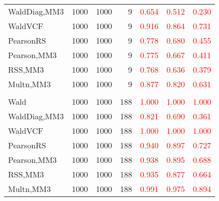 \documentclass[
]{article}
\begin{document}
\begin{table}[H]
{\begin{tabular}[t]{lrrrrrr}
\hspace{1em}WaldDiag,MM3 & 1000 & 1000 & 9 & \textcolor{red}{0.654} & \textcolor{red}{0.512} & \textcolor{red}{0.230}\\
\hspace{1em}WaldVCF & 1000 & 1000 & 9 & \textcolor{red}{0.916} & \textcolor{red}{0.864} & \textcolor{red}{0.731}\\
\hspace{1em}PearsonRS & 1000 & 1000 & 9 & \textcolor{red}{0.778} & \textcolor{red}{0.680} & \textcolor{red}{0.455}\\
\hspace{1em}Pearson,MM3 & 1000 & 1000 & 9 & \textcolor{red}{0.775} & \textcolor{red}{0.667} & \textcolor{red}{0.411}\\
\hspace{1em}RSS,MM3 & 1000 & 1000 & 9 & \textcolor{red}{0.768} & \textcolor{red}{0.636} & \textcolor{red}{0.379}\\
\hspace{1em}Multn,MM3 & 1000 & 1000 & 9 & \textcolor{red}{0.877} & \textcolor{red}{0.820} & \textcolor{red}{0.631}\\
\addlinespace[0.3em]
\multicolumn{7}{l}{\textbf{3F 15V}}\\
\hspace{1em}Wald & 1000 & 1000 & 188 & \textcolor{red}{1.000} & \textcolor{red}{1.000} & \textcolor{red}{1.000}\\
\hspace{1em}WaldDiag,MM3 & 1000 & 1000 & 188 & \textcolor{red}{0.821} & \textcolor{red}{0.690} & \textcolor{red}{0.361}\\
\hspace{1em}WaldVCF & 1000 & 1000 & 188 & \textcolor{red}{1.000} & \textcolor{red}{1.000} & \textcolor{red}{1.000}\\
\hspace{1em}PearsonRS & 1000 & 1000 & 188 & \textcolor{red}{0.940} & \textcolor{red}{0.897} & \textcolor{red}{0.727}\\
\hspace{1em}Pearson,MM3 & 1000 & 1000 & 188 & \textcolor{red}{0.938} & \textcolor{red}{0.895} & \textcolor{red}{0.688}\\
\hspace{1em}RSS,MM3 & 1000 & 1000 & 188 & \textcolor{red}{0.935} & \textcolor{red}{0.877} & \textcolor{red}{0.664}\\
\hspace{1em}Multn,MM3 & 1000 & 1000 & 188 & \textcolor{red}{0.991} & \textcolor{red}{0.975} & \textcolor{red}{0.894}\\
\bottomrule
\end{tabular}}
\endgroup{}
\end{table}
\end{document}
